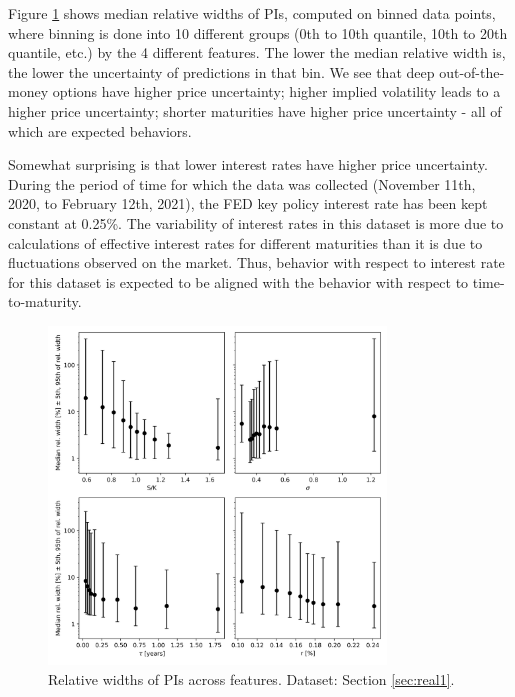 \documentclass{article}
\theoremstyle{definition}
\begin{document}
Figure \ref{fig:real1_rel_widths_vs_features} shows median relative widths of PIs, computed on binned data points, where binning is done into 10 different groups (0th to 10th quantile, 10th to 20th quantile, etc.) by the 4 different features. The lower the median relative width is, the lower the uncertainty of predictions in that bin. We see that deep out-of-the-money options have higher price uncertainty; higher implied volatility leads to a higher price uncertainty; shorter maturities have higher price uncertainty - all of which are expected behaviors.

Somewhat surprising is that lower interest rates have higher price uncertainty. During the period of time for which the data was collected (November 11th, 2020, to February 12th, 2021), the FED key policy interest rate has been kept constant at 0.25\%. The variability of interest rates in this dataset is more due to calculations of effective interest rates for different maturities than it is due to fluctuations observed on the market. Thus, behavior with respect to interest rate for this dataset is expected to be aligned with the behavior with respect to time-to-maturity. 

\begin{figure}
\centering
\includegraphics[width=0.8\textwidth]{reports/figures/real_data_replication/real1_rel_widths_to_features.png}
\caption{Relative widths of PIs across features. Dataset: Section \ref{sec:real1}.}
\label{fig:real1_rel_widths_vs_features}
\end{figure}
\end{document}
